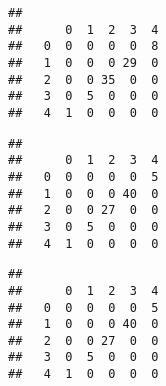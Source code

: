 \documentclass[]{article}
\newenvironment{Shaded}{\begin{snugshade}}{\end{snugshade}}
\newcommand{\KeywordTok}[1]{\textcolor[rgb]{0.13,0.29,0.53}{\textbf{#1}}}
\newcommand{\DataTypeTok}[1]{\textcolor[rgb]{0.13,0.29,0.53}{#1}}
\newcommand{\DecValTok}[1]{\textcolor[rgb]{0.00,0.00,0.81}{#1}}
\newcommand{\StringTok}[1]{\textcolor[rgb]{0.31,0.60,0.02}{#1}}
\newcommand{\CommentTok}[1]{\textcolor[rgb]{0.56,0.35,0.01}{\textit{#1}}}
\newcommand{\OtherTok}[1]{\textcolor[rgb]{0.56,0.35,0.01}{#1}}
\newcommand{\OperatorTok}[1]{\textcolor[rgb]{0.81,0.36,0.00}{\textbf{#1}}}
\newcommand{\NormalTok}[1]{#1}
\begin{document}
\begin{verbatim}
##    
##      0  1  2  3  4
##   0  0  0  0  0  8
##   1  0  0  0 29  0
##   2  0  0 35  0  0
##   3  0  5  0  0  0
##   4  1  0  0  0  0
\end{verbatim}

\begin{Shaded}
\end{Shaded}

\begin{verbatim}
##    
##      0  1  2  3  4
##   0  0  0  0  0  5
##   1  0  0  0 40  0
##   2  0  0 27  0  0
##   3  0  5  0  0  0
##   4  1  0  0  0  0
\end{verbatim}

\begin{Shaded}
\end{Shaded}

\begin{verbatim}
##    
##      0  1  2  3  4
##   0  0  0  0  0  5
##   1  0  0  0 40  0
##   2  0  0 27  0  0
##   3  0  5  0  0  0
##   4  1  0  0  0  0
\end{verbatim}

\begin{Shaded}
\end{Shaded}
\end{document}
